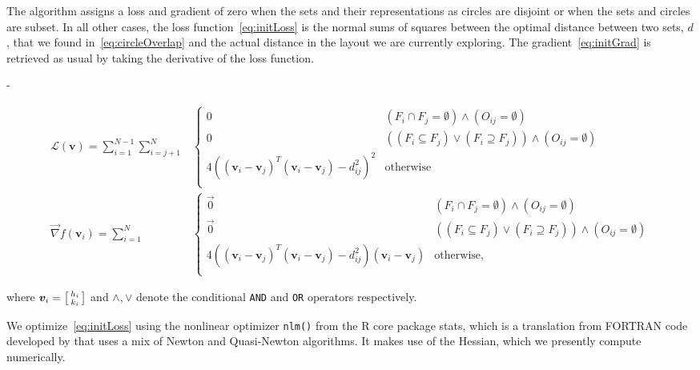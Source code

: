 \documentclass[
  oneside,
  usegeometry,
  numbers=noendperiod,
  openany,
  parskip=half
]{scrbook}\usepackage[]{graphicx}\usepackage{xcolor}
\newlength{\overhang}
\newenvironment{fullwidth}{
  \begin{addmargin*}[0em]{-\overhang}
  }{
  \end{addmargin*}
}
\newcommand{\pkg}[1]{{\fontseries{b}\selectfont #1}}
\newcommand{\code}[1]{\texttt{#1}}
\begin{document}
The algorithm assigns a loss and gradient of zero when the sets and their representations as circles are disjoint or when the sets and circles are subset. In all other cases, the loss function~\eqref{eq:initLoss} is the normal sums of squares between the optimal distance between two sets, $d$, that we found in~\eqref{eq:circleOverlap} and the actual distance in the layout we are currently exploring. The gradient~\eqref{eq:initGrad} is retrieved as usual by taking the derivative of the loss function.
\begin{fullwidth}
\begin{align}
\mathcal{L}(\bm{v}) = \sum_{i=1}^{N-1} \sum_{i=j+1}^{N}
& \begin{cases}
  0 & (F_i \cap F_j = \emptyset) \wedge (O_{ij} = \emptyset)\\
  0 & \left((F_i \subseteq F_j) \vee (F_i \supseteq F_j)\right) \wedge (O_{ij}=\emptyset)\\
  4 ((\bm{v}_i - \bm{v}_j)^{\scriptscriptstyle T}(\bm{v}_i - \bm{v}_j) - d_{ij}^2)^2  & \text{otherwise} \\
\end{cases} \label{eq:initLoss} \\
\vec{\nabla} f(\bm{v}_i) = \sum_{i=1}^N
& \begin{cases}
  \vec{0} & (F_i \cap F_j = \emptyset) \wedge (O_{ij} = \emptyset)\\
  \vec{0} & \left((F_i \subseteq F_j) \vee (F_i \supseteq F_j)\right) \wedge (O_{ij}=\emptyset)\\
  4 \left((\bm{v}_i - \bm{v}_j)^{\scriptscriptstyle T}(\bm{v}_i - \bm{v}_j) - d_{ij}^2\right) (\bm{v}_i - \bm{v}_j) & \text{otherwise}, \\
\end{cases} \label{eq:initGrad}
\end{align}
\end{fullwidth}
where $\bm{v}_i = \begin{bsmallmatrix}h_i \\ k_i\end{bsmallmatrix}$ and $\wedge,\vee$ denote the conditional \texttt{AND} and \texttt{OR} operators respectively.

We optimize~\eqref{eq:initLoss} using the nonlinear optimizer \code{nlm()} from the R core package \pkg{stats}, which is a translation from FORTRAN code developed by \citet{schnabel_1985} that uses a mix of Newton and Quasi-Newton algorithms. It makes use of the Hessian, which we presently compute numerically.
\end{document}
